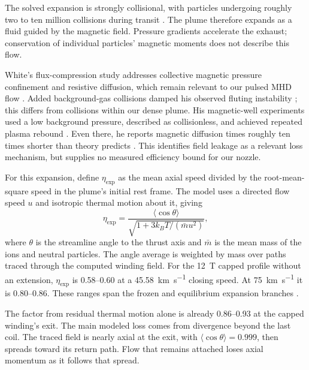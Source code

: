 \documentclass{article}
\begin{document}
The solved expansion is strongly collisional, with particles undergoing roughly two to ten million collisions during transit \cite{Katz_puffsat_impact_sim_2026}. The plume therefore expands as a fluid guided by the magnetic field. Pressure gradients accelerate the exhaust; conservation of individual particles' magnetic moments does not describe this flow.

White's flux-compression study addresses collective magnetic pressure confinement and resistive diffusion, which remain relevant to our pulsed MHD flow \cite[pp.~11--14, 123--124]{white2026flux_compression}. Added background-gas collisions damped his observed fluting instability \cite[pp.~103--104, 113]{white2026flux_compression}; this differs from collisions within our dense plume. His magnetic-well experiments used a low background pressure, described as collisionless, and achieved repeated plasma rebound \cite[pp.~127--130]{white2026flux_compression}. Even there, he reports magnetic diffusion times roughly ten times shorter than theory predicts \cite[p.~156]{white2026flux_compression}. This identifies field leakage as a relevant loss mechanism, but supplies no measured efficiency bound for our nozzle.

For this expansion, define $\eta_{\mathrm{exp}}$ as the mean axial speed divided by the root-mean-square speed in the plume's initial rest frame. The model uses a directed flow speed $u$ and isotropic thermal motion about it, giving
\begin{equation}
\eta_{\mathrm{exp}} = \frac{\langle\cos\theta\rangle}{\sqrt{1 + 3k_BT/(\bar{m}u^2)}},
\label{eq:expansion_efficiency}
\end{equation}
where $\theta$ is the streamline angle to the thrust axis and $\bar{m}$ is the mean mass of the ions and neutral particles. The angle average is weighted by mass over paths traced through the computed winding field. For the \SI{12}{\tesla} capped profile without an extension, $\eta_{\mathrm{exp}}$ is \numrange{0.58}{0.60} at a \SI{45.58}{\kilo\meter\per\second} closing speed. At \SI{75}{\kilo\meter\per\second} it is \numrange{0.80}{0.86}. These ranges span the frozen and equilibrium expansion branches \cite{Katz_puffsat_impact_sim_2026}.

The factor from residual thermal motion alone is already \numrange{0.86}{0.93} at the capped winding's exit. The main modeled loss comes from divergence beyond the last coil. The traced field is nearly axial at the exit, with $\langle\cos\theta\rangle = 0.999$, then spreads toward its return path. Flow that remains attached loses axial momentum as it follows that spread.
\end{document}
